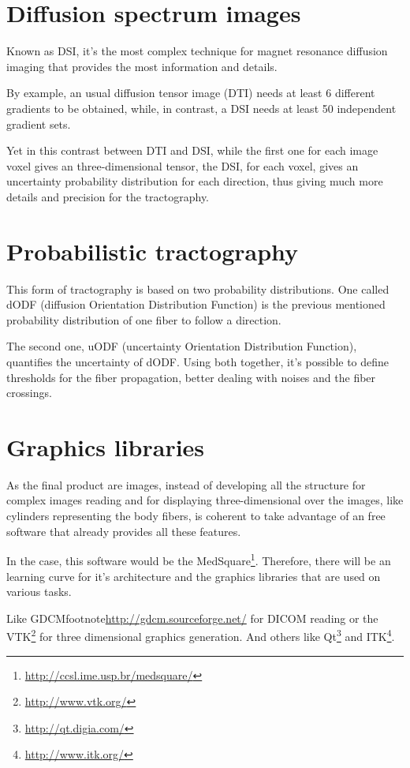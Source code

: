 \documentclass[a4paper,11pt]{report}
\begin{document}
  \section{Diffusion spectrum images}
  Known as DSI, it's the most complex technique for magnet resonance diffusion imaging that provides the most information and details.

  By example, an usual diffusion tensor image (DTI) needs at least 6 different gradients to be obtained, while, in contrast, a DSI needs at least 50 independent gradient sets.

  Yet in this contrast between DTI and DSI, while the first one for each image voxel gives an three-dimensional tensor, the DSI, for each voxel, gives an uncertainty probability distribution for each direction, thus giving much more details and precision for the tractography.

  \section{Probabilistic tractography}
  This form of tractography is based on two probability distributions. One called dODF (diffusion Orientation Distribution Function) is the previous mentioned probability distribution of one fiber to follow a direction.

  The second one, uODF (uncertainty Orientation Distribution Function), quantifies the uncertainty of dODF. Using both together, it's possible to define thresholds for the fiber propagation, better dealing with noises and the fiber crossings.

  \section{Graphics libraries}
  As the final product are images, instead of developing all the structure for complex images reading and for displaying three-dimensional over the images, like cylinders representing the body fibers, is coherent to take advantage of an free software that already provides all these features.

  In the case, this software would be the MedSquare\footnote{\url{http://ccsl.ime.usp.br/medsquare/}}. Therefore, there will be an learning curve for it's architecture and the graphics libraries that are used on various tasks.

  Like GDCMfootnote{\url{http://gdcm.sourceforge.net/}} for DICOM reading or the VTK\footnote{\url{http://www.vtk.org/}} for three dimensional graphics generation. And others like Qt\footnote{\url{http://qt.digia.com/}} and ITK\footnote{\url{http://www.itk.org/}}.
\end{document}
